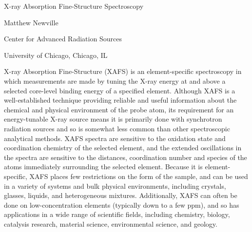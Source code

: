 \newcommand{\mytitle}{X-ray Absorption Fine-Structure Spectroscopy}
\newcommand{\myauthor}{Matthew Newville}

\begin{center}
  \Large{X-ray Absorption Fine-Structure Spectroscopy}
\end{center}
\vspace{5mm}

\begin{center} Matthew Newville \end{center}
\begin{center} Center for Advanced Radiation Sources\par
University of Chicago, Chicago, IL\par\end{center}

\vspace{5mm}

X-ray Absorption Fine-Structure (XAFS) is an element-specific spectroscopy
in which measurements are made by tuning the X-ray energy at and above a
selected core-level binding energy of a specified element.  Although XAFS
is a well-established technique providing reliable and useful information
about the chemical and physical environment of the probe atom, its
requirement for an energy-tunable X-ray source means it is primarily done
with synchrotron radiation sources and so is somewhat less common than
other spectroscopic analytical methods.  XAFS spectra are sensitive to the
oxidation state and coordination chemistry of the selected element, and the
extended oscillations in the spectra are sensitive to the distances,
coordination number and species of the atoms immediately surrounding the
selected element.  Because it is element-specific, XAFS places few
restrictions on the form of the sample, and can be used in a variety of
systems and bulk physical environments, including crystals, glasses,
liquids, and heterogeneous mixtures.  Additionally, XAFS can often be done
on low-concentration elements (typically down to a few ppm), and so has
applications in a wide range of scientific fields, including chemistry,
biology, catalysis research, material science, environmental science, and
geology.

\thispagestyle{empty}
\clearpage

